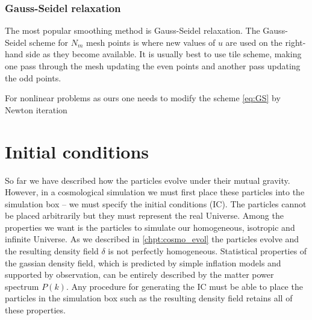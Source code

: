 \subsubsection{Gauss-Seidel relaxation}
The most popular smoothing method is Gauss-Seidel relaxation. The Gauss-Seidel scheme for $N_m$ mesh points is
where new values of $u$ are used on the right-hand side as they become available. It is usually best to use tile scheme,  making one pass through the mesh updating the even points and another pass updating the odd points.

For nonlinear problems as ours one needs to modify the scheme \eqref{eq:GS} by Newton iteration
\section{Initial conditions}
So far we have described how the particles evolve under their mutual gravity. However, in a cosmological simulation we must first place these particles into the simulation box -- we must specify the initial conditions (IC). The particles cannot be placed arbitrarily but they must represent the real Universe. Among the properties we want is the particles to simulate our homogeneous, isotropic and infinite Universe. As we described in \autoref{chpt:cosmo_evol} the particles evolve and the resulting density field $\delta$ is not perfectly homogeneous. Statistical properties of the gassian density field, which is predicted by simple inflation models and supported by observation, can be entirely described by the matter power spectrum $P(k)$. Any procedure for generating the IC must be able to place the particles in the simulation box such as the resulting density field retains all of these properties.

